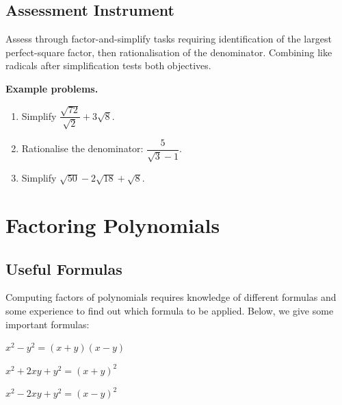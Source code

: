 \subsection{Assessment Instrument}
\label{ssec:asse-3669}


Assess through factor-and-simplify tasks requiring identification of the
largest perfect-square factor, then rationalisation of the denominator.
Combining like radicals after simplification tests both objectives.

\textbf{Example problems.}
\begin{enumerate}
    \item Simplify $\dfrac{\sqrt{72}}{\sqrt{2}} + 3\sqrt{8}$.
    \item Rationalise the denominator: $\dfrac{5}{\sqrt{3}-1}$.
    \item Simplify $\sqrt{50} - 2\sqrt{18} + \sqrt{8}$.
\end{enumerate}



\section{Factoring Polynomials}
\label{sec:fact-754c}



\subsection{Useful Formulas}
\label{sss:usef-1334}




Computing factors of polynomials requires knowledge of different formulas and some
experience to find out which formula to be applied. Below, we give some important
formulas:



${x^2-y^2=(x+y)(x-y)}$



${x^2+2xy+y^2=(x+y)^2}$



${x^2-2xy+y^2=(x-y)^2}$



